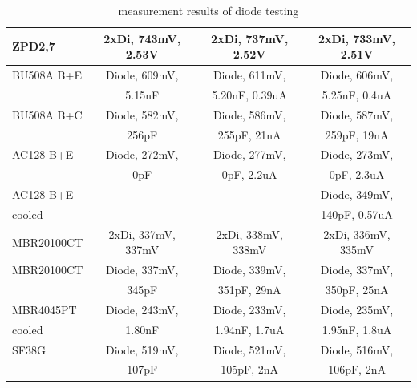 \begin{table}[H]
\begin{center}
\begin{tabular}{| l | c | c | c |}
    \hline
ZPD2,7     & 2xDi, 743mV, 2.53V   & 2xDi, 737mV, 2.52V  & 2xDi, 733mV, 2.51V \\
    \hline
BU508A B+E & Diode, 609mV,        & Diode, 611mV,                & Diode, 606mV,              \\
           &               5.15nF &               5.20nF, 0.39uA &               5.25nF, 0.4uA\\
    \hline
BU508A B+C & Diode, 582mV,        & Diode, 586mV,             & Diode, 587mV,            \\
           &               256pF  &               255pF, 21nA &               259pF, 19nA\\
    \hline
AC128 B+E  & Diode, 272mV,        & Diode, 277mV,              & Diode, 273mV,             \\
           &               0pF    &               0pF, 2.2uA   &               0pF, 2.3uA  \\
    \hline
AC128 B+E  &                      &                     & Diode, 349mV,               \\
cooled     &                      &                     &               140pF, 0.57uA \\
    \hline
MBR20100CT & 2xDi, 337mV, 337mV   & 2xDi, 338mV, 338mV  & 2xDi, 336mV, 335mV  \\
    \hline
MBR20100CT & Diode, 337mV,        & Diode, 339mV,             & Diode, 337mV,            \\
           &               345pF  &               351pF, 29nA &               350pF, 25nA\\
    \hline
MBR4045PT  & Diode, 243mV,        & Diode, 233mV,               & Diode, 235mV,              \\
cooled     &               1.80nF &               1.94nF, 1.7uA &               1.95nF, 1.8uA\\
    \hline
SF38G      & Diode, 519mV,        & Diode, 521mV,            & Diode, 516mV,            \\
           &               107pF  &               105pF, 2nA &               106pF, 2nA \\
    \hline
    \end{tabular}
  \end{center}
  \caption{measurement results of diode testing}
  \label{tab:diodes} 
\end{table}

